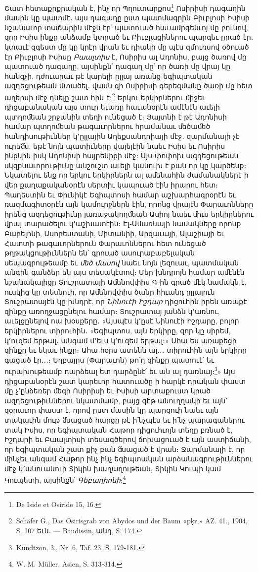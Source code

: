 \documentclass{article}
\begin{document}
{Շատ հետաքրքրական է, ինչ որ Պղուտարքոս\footnote{De Iside et Osiride 15, 16.} Ոսիրիսի դագաղին մասին կը պատմէ․ այս դագաղը ըստ պատմագրին Բիւբլոսի Իսիսի նշանաւոր տաճարին մէջն էր՝ պատուած հաւամրգենւոյ մը բունով, զոր Իսիս ինքը անձամբ կտրած եւ Բիւբլացիներու պարգեւ ըրած էր․ կտաւէ զգեստ մը կը կրէր վրան եւ դիակի մը պէս զմուռսով օծուած էր Բիւբլոսի Իսիսը \emph{Բաալտիս} է, Ոսիրիս ալ Ադոնիս, բայց ծառով մը պատուած դագաղը, այսինքն՝ դագաղ մը՝ որ ծառի մը վրայ կը հանգչի, դժուարաւ թէ կարելի ըլլայ առանց եգիպտական ազդեցութեան մտածել․ վասն զի Ոսիրիսի գերեզմանը ծառի մը հետ աղերսի մէջ դնելը շատ հին է։\footnote{Schäfer G., Das Osirisgrab von Abydos und der Baum «pḳr,» AZ. 41., 1904, S. 107 եւն․ — Baudissin, անդ, S. 174.} Երկու երկիրներու ﬕջեւ դիցաբանական այս տուր եւառը հաւանօրէն ամէնէն աւելի պտղոﬔան շրջանին տեղի ունեցած է։ Յայտնի է թէ Ադոնիսի համար պտղոﬔան թագաւորներու հրամանաւ ﬔծաﬔծ հանդիսութիւններ կ՚ըլլային Աղեքսանդրիայի մէջ․ զարմանալի չէ ուրեﬓ, եթէ նոյն պատիւները վայելէին նաեւ Իսիս եւ Ոսիրիս ինքնին իսկ Ադոնիսի հայրենիքի մէջ։ Այս փոփոխ ազդեցութեան սկզբնաւորութիւնը անշուշտ աւելի կանուխ է քան որ կը կարծենք։ Նկատելու ենք որ երկու երկիրներն ալ աﬔնահին ժամանակներէ ի վեր քաղաքականօրէն սերտիւ կապուած էին իրարու հետ։ Պաղեստին եւ Փիւնիկէ Եգիպտոսի համար աշխարհագրօրէն եւ ռազմագիտօրէն այն կամուրջներն էին, որոնց վրայէն Փարաւոնները իրենց ազդեցութիւնը յառաջակողﬔան Ասիոյ նաեւ ﬕւս երկիրներու վրայ տարածելու կ՚աշխատէին։ Էլ֊Ամառնայի նամակները որոնք Բաբելոնի, Ասորեստանի, Միտանիի, Արզաւայի, Ալաշիայի եւ Հատտի թագաւորներուն Փարաւոններու հետ ունեցած թղթակցութիւններն են՝ գրուած ասուրաբաբելական սեպագրութեամբ եւ \emph{ﬔծ մասով} նաեւ նոյն լեզուաւ, պատմական անգին գանձեր են այս տեսակէտով։ Մեր խնդրոյն համար ամէնէն նշանակալիցը Տուշրատայի Աﬔնովփիս Գ֊ին գրած մէկ նամակն է, ուսկից կը տեսնուի, որ Աﬔնովփիս ծանր հիւանդ ըլլալուն Տուշրատայէն կը խնդրէ, որ \emph{Նինուէի Իշդար} դիցուհին իրեն առաքէ զինքը առողջացընելու համար։ Տուշրատայ յանձն կ՚առնու, աւելցընելով ոա խօսքերը․ «Այսպէս կ՚ըսէ Նինուէի Իշդարը, բոլոր երկիրներու տիրուհին․ «Եգիպտոս, այն երկիրը, զոր կը սիրեմ, կ՚ուզեմ երթալ․ անգամ մ՚եւս կ՚ուզեմ երթալ։» Ահա ես առաքեցի զինքը եւ եկաւ ինքը։ Ահա հօրս ատենն ալ․․․ տիրուհին այն երկիրը գացած էր․․․։ Եղբայրս (Փարաւոն) թո՛ղ զինքը պատուէ՛ եւ ուրախութեամբ դարձեալ ետ դարձընէ՛ եւ ան ալ դառնայ։\footnote{Kundtzon, 3., Nr. 6, Taf. 23, S. 179֊181.}» Այս դիցաբանօրէն շատ կարեւոր հատուածը ի հարկէ դրական փաստ մը չ՚ընձեռեր ﬔզի Ոսիրիսի եւ Իսիսի արտաքուստ կրած ազդեցութիւններու նկատմամբ, բայց գէթ անուղղակի եւ այն՝ զօրաւոր փաստ է, որով ըստ մասին կը պարզուի նաեւ այն տակաւին մութ ﬓացած հարցը թէ ի՛նչպէս եւ ի՛նչ պարագաներու տակ Իսիս, որ եգիպտական Հաթոր դիցուհւոյն տեղը բռնած է, Իշդարի եւ Բաալտիսի տեսագծերով ճոխացուած է այն աստիճանի, որ եգիպտական շատ քիչ բան ﬓացած է վրան։ Ջարմանալի է, որ ﬕնչեւ անգամ Հաթոր ինչ ինչ եգիպտական արձանագրութիւններու մէջ կ՚անուանուի Տիկին խաղաղութեան, Տիկին Կուպի կամ Կուպետի, այսինքն՝ \emph{Գեբաղիոնի}։\footnote{W. M. Müller, Asien, S. 313֊314.}

}
\end{document}
